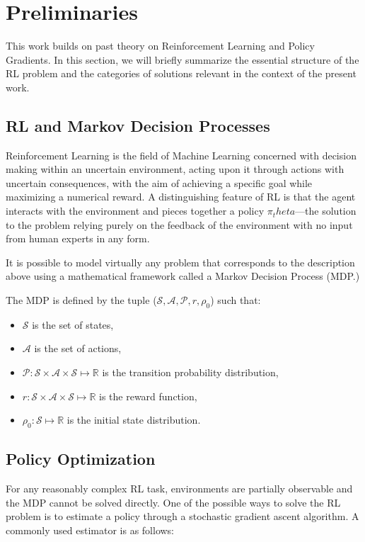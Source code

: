 \section{Preliminaries}
\label{sec:prelim}
This work builds on past theory on Reinforcement Learning and Policy Gradients. In this section, we will briefly summarize the essential structure of the RL problem and the categories of solutions relevant in the context of the present work.

\subsection{RL and Markov Decision Processes}

Reinforcement Learning is the field of Machine Learning concerned with decision making within an uncertain environment, acting upon it through actions with uncertain consequences, with the aim of achieving a specific goal while maximizing a numerical reward. A distinguishing feature of RL is that the agent interacts with the environment and pieces together a policy $\pi_theta$––the solution to the problem relying purely on the feedback of the environment with no input from human experts in any form. 

It is possible to model virtually any problem that corresponds to the description above using a mathematical framework called a Markov Decision Process (MDP.) 

The MDP is defined by the tuple ($\mathcal{S}, \mathcal{A}, \mathcal{P}, r, \rho_0$) such that:
\begin{itemize}
\item $\mathcal{S}$ is the set of states, 
\item $\mathcal{A}$ is the set of actions, 
\item $\mathcal{P}: \mathcal{S}\times\mathcal{A}\times\mathcal{S}\mapsto \mathbb{R}$ is the transition probability distribution,
\item $r: \mathcal{S}\times\mathcal{A}\times\mathcal{S} \mapsto \mathbb{R}$ is the reward function,
\item $\rho_0:\mathcal{S}\mapsto\mathbb{R}$ is the initial state distribution.
\end{itemize}

\subsection{Policy Optimization}

For any reasonably complex RL task, environments are partially observable and the MDP cannot be solved directly. One of the possible ways to solve the RL problem is to estimate a policy through a stochastic gradient ascent algorithm. A commonly used estimator is as follows:

